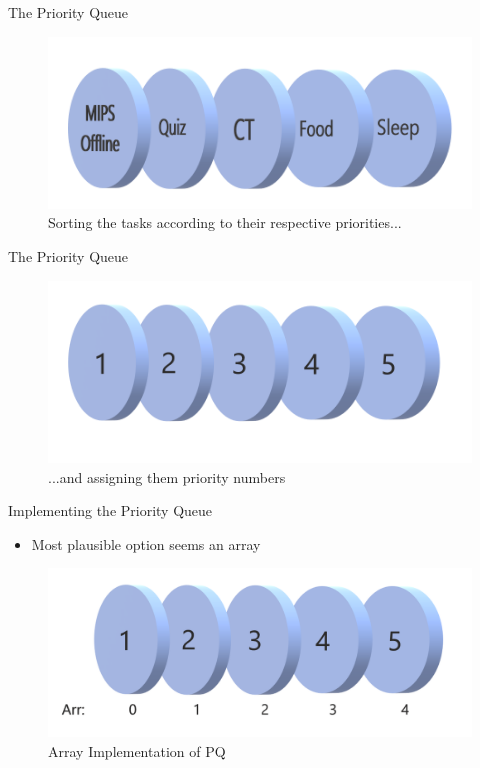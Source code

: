 \documentclass{beamer}
\begin{document}
\begin{frame}{The Priority Queue}
    \begin{figure}
        \centering
        \includegraphics[scale=0.3]{2.png}
        \caption{Sorting the tasks according to their respective priorities...}
        \label{fig:my_label}
    \end{figure}
\end{frame}

\begin{frame}{The Priority Queue}
    \begin{figure}
        \centering
        \includegraphics[scale=0.3]{3.png}
        \caption{...and assigning them priority numbers}
        \label{fig:my_label}
    \end{figure}
\end{frame}

\begin{frame}{Implementing the Priority Queue}
\begin{itemize}
    \item Most plausible option seems an array
\end{itemize}
\pause
\begin{figure}
    \centering
    \includegraphics[scale=0.25]{5.png}
    \caption{Array Implementation of PQ}
    \label{fig:my_label}
\end{figure}
\end{frame}
\end{document}
